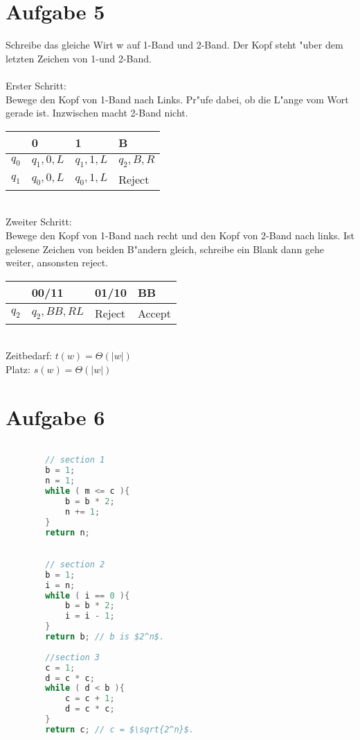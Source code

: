 \documentclass[a4paper,11pt]{scrartcl}
\begin{document}
\section*{Aufgabe 5}

Schreibe das gleiche Wirt w auf 1-Band und 2-Band. Der Kopf steht "uber dem letzten Zeichen von 1-und 2-Band. \\ \ \\
Erster Schritt:\\
Bewege den Kopf von 1-Band nach Links. Pr"ufe dabei, ob die L"ange vom Wort gerade ist. Inzwischen macht 2-Band nicht.


\begin{table}[h!]
	\begin{tabular}{|l|l|l|l|}
		\hline
		& 0         & 1         & B         \\ \hline
		$q_0$ & $q_1,0,L$ & $q_1,1,L$ & $q_2,B,R$ \\ \hline
		$q_1$ & $q_0,0,L$ & $q_0,1,L$ & Reject    \\ \hline
	\end{tabular}
\end{table}
\ \\
Zweiter Schritt:\\
Bewege den Kopf von 1-Band nach recht und den Kopf von 2-Band nach links. Ist gelesene Zeichen von beiden B"andern gleich, schreibe ein Blank dann gehe weiter, ansonsten reject.


\begin{table}[h!]
	\begin{tabular}{|l|l|l|l|}
		\hline
		& 00/11      & 01/10  & BB     \\ \hline
		$q_2$ & $q_2,BB,RL$ & Reject & Accept \\ \hline
	\end{tabular}
\end{table}

\ \\
Zeitbedarf: $t(w)=\Theta (|w|)$\\
Platz: $s(w)=\Theta (|w|)$


\section*{Aufgabe 6}

	\begin{lstlisting}[language=java, mathescape=true]

		// section 1
		b = 1;
		n = 1;
		while ( m <= c ){
			b = b * 2;
			n += 1;
		}
		return n;  

		
		// section 2
		b = 1;
		i = n;
		while ( i == 0 ){
			b = b * 2;
			i = i - 1;
		}
		return b; // b is $2^n$.
		
		//section 3
		c = 1;
		d = c * c;
		while ( d < b ){
			c = c + 1;
			d = c * c;
		}
		return c; // c = $\sqrt{2^n}$.
	\end{lstlisting}
\end{document}
